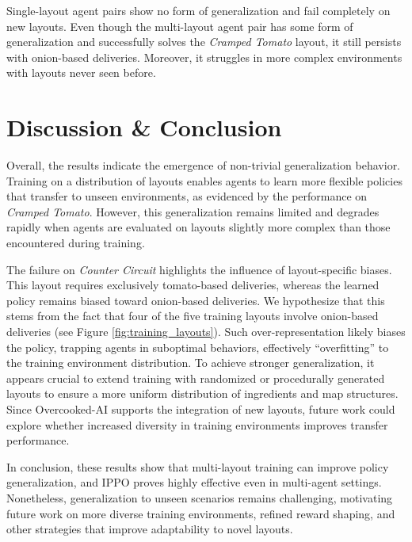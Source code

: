 \documentclass{article}
\begin{document}
Single-layout agent pairs show no form of generalization and fail completely
on new layouts. Even though the multi-layout agent pair has some form of
generalization and successfully solves the \textit{Cramped Tomato} layout, it
still persists with onion-based deliveries. Moreover, it struggles in more
complex environments with layouts never seen before.

\section{Discussion \& Conclusion}

Overall, the results indicate the emergence of non-trivial generalization
behavior. Training on a distribution of layouts enables agents to learn more
flexible policies that transfer to unseen environments, as evidenced by the
performance on \textit{Cramped Tomato}. However, this generalization remains
limited and degrades rapidly when agents are evaluated on layouts slightly
more complex than those encountered during training.

The failure on \textit{Counter Circuit} highlights the influence of
layout-specific biases. This layout requires exclusively tomato-based
deliveries, whereas the learned policy remains biased toward onion-based
deliveries. We hypothesize that this stems from the fact that four of the five
training layouts involve onion-based deliveries (see Figure
\ref{fig:training_layouts}). Such over-representation likely biases the
policy, trapping agents in suboptimal behaviors, effectively ``overfitting''
to the training environment distribution. To achieve stronger generalization,
it appears crucial to extend training with randomized or procedurally
generated layouts to ensure a more uniform distribution of ingredients and map
structures. Since Overcooked-AI supports the integration of new layouts,
future work could explore whether increased diversity in training environments
improves transfer performance.

In conclusion, these results show that multi-layout training can improve
policy generalization, and IPPO proves highly effective even in multi-agent
settings. Nonetheless, generalization to unseen scenarios remains challenging,
motivating future work on more diverse training environments, refined reward
shaping, and other strategies that improve adaptability to novel layouts.

\newpage



\newpage
\appendix
\end{document}
